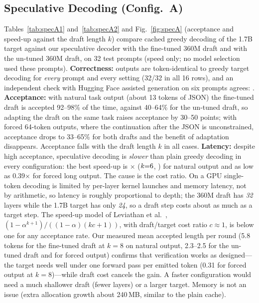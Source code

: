 \subsection{Speculative Decoding (Config.~A)}
\label{sec:specres}
Tables~\ref{tab:specA1} and~\ref{tab:specA2} and Fig.~\ref{fig:specA} (acceptance and speed-up against the draft length $k$) compare cached greedy decoding of the 1.7B target against our speculative decoder with the fine-tuned 360M draft and with the un-tuned 360M draft, on 32 test prompts (speed only; no model selection used these prompts). \textbf{Correctness:} outputs are token-identical to greedy target decoding for \emph{every} prompt and every setting (32/32 in all 16 rows), and an independent check with Hugging Face assisted generation on six prompts agrees: \GSpecHF. \textbf{Acceptance:} with natural task output (about 13 tokens of JSON) the fine-tuned draft is accepted 92--98\% of the time, against 40--64\% for the un-tuned draft, so adapting the draft on the same task raises acceptance by 30--50 points; with forced 64-token outputs, where the continuation after the JSON is unconstrained, acceptance drops to 33--65\% for both drafts and the benefit of adaptation disappears. Acceptance falls with the draft length $k$ in all cases. \textbf{Latency:} despite high acceptance, speculative decoding is \emph{slower} than plain greedy decoding in every configuration: the best speed-up is \GSpecBestSpeedup$\times$ ($k{=}6$, \GSpecBestDraft) for natural output and as low as 0.39$\times$ for forced long output. The cause is the cost ratio. On a GPU single-token decoding is limited by per-layer kernel launches and memory latency, not by arithmetic, so latency is roughly proportional to depth; the 360M draft has \emph{32} layers while the 1.7B target has only \emph{24}, so a draft step costs about as much as a target step. The speed-up model of Leviathan et al.~\cite{leviathan2023speculative}, $(1-\alpha^{k+1})/((1-\alpha)(kc+1))$, with draft/target cost ratio $c\approx1$, is below one for any acceptance rate. Our measured mean accepted length per round (5.8 tokens for the fine-tuned draft at $k{=}8$ on natural output, 2.3--2.5 for the un-tuned draft and for forced output) confirms that verification works as designed---the target needs well under one forward pass per emitted token (0.31 for forced output at $k{=}8$)---while draft cost cancels the gain. A faster configuration would need a much shallower draft (fewer layers) or a larger target. Memory is not an issue (extra allocation growth about 240\,MB, similar to the plain cache).

